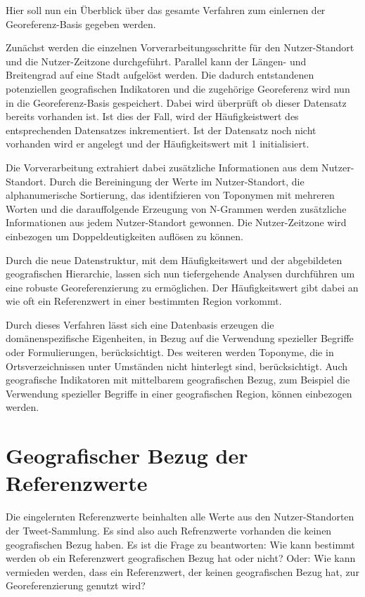 			Hier soll nun ein Überblick über das gesamte Verfahren zum einlernen der Georeferenz-Basis gegeben werden.
		
			Zunächst werden die einzelnen Vorverarbeitungsschritte für den Nutzer-Standort und die Nutzer-Zeitzone durchgeführt.
			Parallel kann der Längen- und Breitengrad auf eine Stadt aufgelöst werden.
			Die dadurch entstandenen potenziellen geografischen Indikatoren und die zugehörige Georeferenz wird nun in die Georeferenz-Basis gespeichert. 
			Dabei wird überprüft ob dieser Datensatz bereits vorhanden ist. 
			Ist dies der Fall, wird der Häufigkeistwert des entsprechenden Datensatzes inkrementiert.
			Ist der Datensatz noch nicht vorhanden wird er angelegt und der Häufigkeitswert mit 1 initialisiert.

			Die Vorverarbeitung extrahiert dabei zusätzliche Informationen aus dem Nutzer-Standort.
			Durch die Bereiningung der Werte im Nutzer-Standort, die alphanumerische Sortierung, das identifzieren von Toponymen mit mehreren Worten und die darauffolgende Erzeugung von N-Grammen werden zusätzliche Informationen aus jedem Nutzer-Standort gewonnen.
			Die Nutzer-Zeitzone wird einbezogen um Doppeldeutigkeiten auflösen zu können.

			Durch die neue Datenstruktur, mit dem Häufigkeitswert und der abgebildeten geografischen Hierarchie, lassen sich nun tiefergehende Analysen durchführen um eine robuste Georeferenzierung zu ermöglichen. 
			Der Häufigkeitswert gibt dabei an wie oft ein Referenzwert in einer bestimmten Region vorkommt.

			Durch dieses Verfahren lässt sich eine Datenbasis erzeugen die domänenspezifische Eigenheiten, in Bezug auf die Verwendung spezieller Begriffe oder Formulierungen, berücksichtigt.
			Des weiteren werden Toponyme, die in Ortsverzeichnissen unter Umständen nicht hinterlegt sind, berücksichtigt.
			Auch geografische Indikatoren mit mittelbarem geografischen Bezug, zum Beispiel die Verwendung spezieller Begriffe in einer geografischen Region, können einbezogen werden. 

	\section{Geografischer Bezug der Referenzwerte}
			
		Die eingelernten Referenzwerte beinhalten alle Werte aus den Nutzer-Standorten der Tweet-Sammlung.
		Es sind also auch Refrenzwerte vorhanden die keinen geografischen Bezug haben.
		Es ist die Frage zu beantworten: Wie kann bestimmt werden ob ein Referenzwert geografischen Bezug hat oder nicht?
		Oder: Wie kann vermieden werden, dass ein Referenzwert, der keinen geografischen Bezug hat, zur Georeferenzierung genutzt wird?
		
